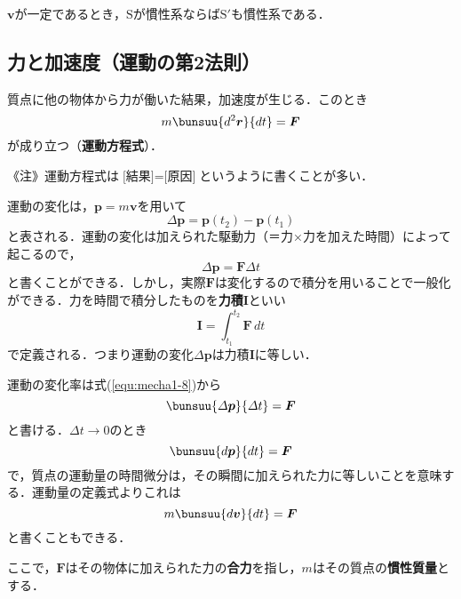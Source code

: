 $\bm{v}$が一定であるとき，$\mathrm{S}$が慣性系ならば$\mathrm{S}'$も慣性系である．



\subsection{力と加速度（運動の第2法則）}
\label{sec:mecha1-2-3}

\begin{tcolorbox}[colback=white]
	質点に他の物体から力が働いた結果，加速度が生じる．このとき
	\begin{equation}
		m\bunsuu{d^2\bm{r}}{dt} = \bm{F}
	\end{equation}
が成り立つ（\textbf{運動方程式}）．
\end{tcolorbox}

《注》運動方程式は$\text{[結果]} = \text{[原因]}$というように書くことが多い．

運動の変化は，$\bm{p} = m\bm{v}$を用いて
\begin{equation*}
	\varDelta \bm{p} = \bm{p}(t_2) - \bm{p}(t_1)
\end{equation*}
と表される．運動の変化は加えられた駆動力（＝力×力を加えた時間）によって起こるので，
\begin{equation}
	\label{equ:mecha1-8}
	\varDelta \bm{p} = \bm{F}\varDelta t
\end{equation}
と書くことができる．しかし，実際$\bm{F}$は変化するので積分を用いることで一般化ができる．力を時間で積分したものを\textbf{力積}$\bm{I}$といい
\begin{equation*}
	\bm{I} = \int_{t_1}^{t_2} \bm{F}\,dt
\end{equation*}
で定義される．つまり運動の変化$\varDelta\bm{p}$は力積$\bm{I}$に等しい．

運動の変化率は式(\ref{equ:mecha1-8})から
\begin{equation*}
	\bunsuu{\varDelta \bm{p}}{\varDelta t} = \bm{F}
\end{equation*}
と書ける．$\varDelta t \to 0$のとき
\begin{equation}
	\bunsuu{d\bm{p}}{dt} = \bm{F}
\end{equation}
で，質点の運動量の時間微分は，その瞬間に加えられた力に等しいことを意味する．運動量の定義式よりこれは
\begin{equation}
	m\bunsuu{d\bm{v}}{dt} = \bm{F}
\end{equation}
と書くこともできる．

ここで，$\bm{F}$はその物体に加えられた力の\textbf{合力}を指し，$m$はその質点の\textbf{慣性質量}とする．

